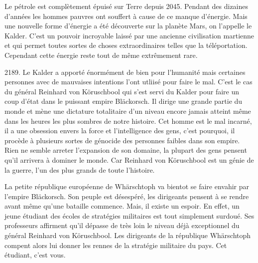 \documentclass{article}
\begin{document}
\par
Le pétrole est complètement épuisé sur Terre depuis 2045. Pendant des dizaines d'années les hommes pauvres ont souffert à cause de ce manque d'énergie. Mais une nouvelle forme d'énergie a été découverte sur la planète Mars, on l'appelle le Kalder. C'est un pouvoir incroyable laissé par une ancienne
civilisation martienne et qui permet toutes sortes de choses extraordinaires telles que la téléportation. Cependant cette énergie reste tout de même extrêmement rare.
\newline

\par
2189. Le Kalder a apporté énormément de bien pour l'humanité mais certaines personnes avec de mauvaises intentions l'ont utliisé pour faire le mal. C'est le cas du général Reinhard von Köruschbool qui s'est servi du Kalder pour faire un coup d'état dans le puissant empire Bläckorsch. Il dirige une grande partie
du monde et mène une dictature totalitaire d'un niveau encore jamais atteint même dans les heures les plus sombres de notre histoire. Cet homme est le mal incarné, il a une obsession envers la force et l'intelligence des gens, c'est pourquoi, il procède à plusieurs sortes de génocide des personnes faibles dans 
son empire. Rien ne semble arreter l'expansion de son domaine, la plupart des gens pensent qu'il arrivera à dominer le monde. Car Reinhard von Köruschbool est un génie de la guerre, l'un des plus grands de toute l'histoire.
\newline

\par
La petite république européenne de Whärschtoph va bientot se faire envahir par l'empire Bläckorsch. Son peuple est désespéré, les dirigeants pensent à se rendre avant même qu'une bataille commence. Mais, il existe un espoir. En effet, un jeune étudiant des écoles de stratégies militaires est tout simplement
surdoué. Ses professeurs affirment qu'il dépasse de très loin le niveau déjà exceptionnel du général Reinhard von Köruschbool. Les dirigeants de la république Whärschtoph compent alors lui donner les rennes de la stratégie militaire du pays. Cet étudiant, c'est vous.
\newline
\end{document}
